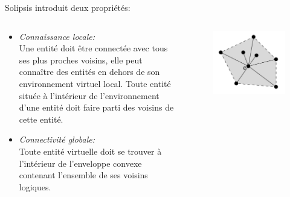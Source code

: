 \documentclass{beamer}
\begin{document}
  \begin{frame}
	Solipsis introduit deux propriétés:
	 \begin{columns}
          \begin{column}{6cm}
	   \begin{itemize}
                \item \textit{Connaissance locale:}\\\tiny{
                Une entité doit être connectée avec tous ses plus proches voisins, elle peut connaître des entités en dehors de son environnement virtuel local. Toute entité située à l'intérieur de l'environnement d'une entité doit faire parti des voisins de cette entité.}
                \item \normalsize{\textit{Connectivité globale:}}\\\tiny{
                Toute entité virtuelle doit se trouver à l'intérieur de l'enveloppe convexe contenant l'ensemble de ses voisins logiques. \\}
	   \end{itemize}
	\end{column}
        \begin{column}{4cm}
        \begin{figure}
        \includegraphics[scale=0.3]{./Ressources/Images/envelop_convex3.png}\\

\end{figure}
\end{column}
\end{columns}
\end{frame}
\end{document}
